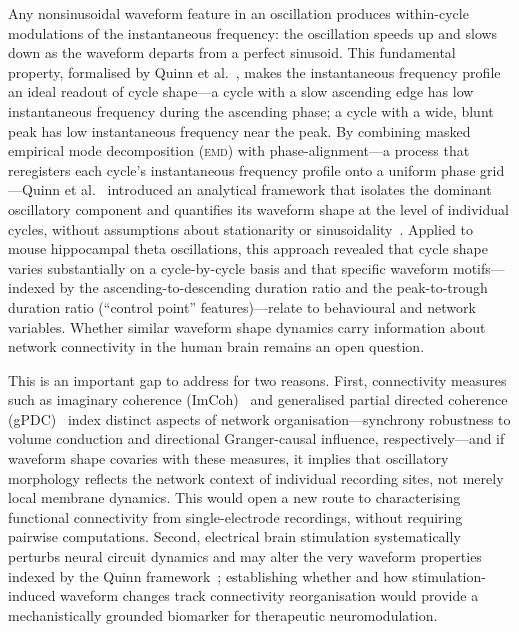 \documentclass[11pt, a4paper]{article}
\newcommand{\emd}{\textsc{emd}}
\begin{document}
Any nonsinusoidal waveform feature in an oscillation produces within-cycle
modulations of the instantaneous frequency: the oscillation speeds up and
slows down as the waveform departs from a perfect sinusoid. This fundamental
property, formalised by Quinn et al.~\citeyearpar{quinn2021within}, makes the
instantaneous frequency profile an ideal readout of cycle shape---a cycle with
a slow ascending edge has low instantaneous frequency during the ascending phase;
a cycle with a wide, blunt peak has low instantaneous frequency near the peak.
By combining masked empirical mode decomposition (\emd) with phase-alignment---a
process that reregisters each cycle's instantaneous frequency profile onto a
uniform phase grid---Quinn et al.~\citeyearpar{quinn2021within} introduced an
analytical framework that isolates the dominant oscillatory component and
quantifies its waveform shape at the level of individual cycles, without
assumptions about stationarity or sinusoidality~\citep{huang1998empirical}.
Applied to mouse hippocampal theta oscillations, this approach revealed that
cycle shape varies substantially on a cycle-by-cycle basis and that specific
waveform motifs---indexed by the ascending-to-descending duration ratio and the
peak-to-trough duration ratio (``control point'' features)---relate to
behavioural and network variables. Whether similar waveform shape dynamics carry
information about network connectivity in the human brain remains an open
question.

This is an important gap to address for two reasons. First, connectivity measures
such as imaginary coherence (ImCoh)~\citep{nolte2004identifying} and generalised
partial directed coherence (gPDC)~\citep{baccala2001partial, baccala2007generalized}
index distinct aspects of network organisation---synchrony robustness to volume
conduction and directional Granger-causal influence, respectively---and if
waveform shape covaries with these measures, it implies that oscillatory
morphology reflects the network context of individual recording sites, not merely
local membrane dynamics. This would open a new route to characterising
functional connectivity from single-electrode recordings, without requiring
pairwise computations. Second, electrical brain stimulation systematically
perturbs neural circuit dynamics and may alter the very waveform properties
indexed by the Quinn framework~\citep{bestmann2015understanding,
voytek2014oscillatory, schaworonkow2019waveform}; establishing whether and how
stimulation-induced waveform changes track connectivity reorganisation would
provide a mechanistically grounded biomarker for therapeutic neuromodulation.
\end{document}
